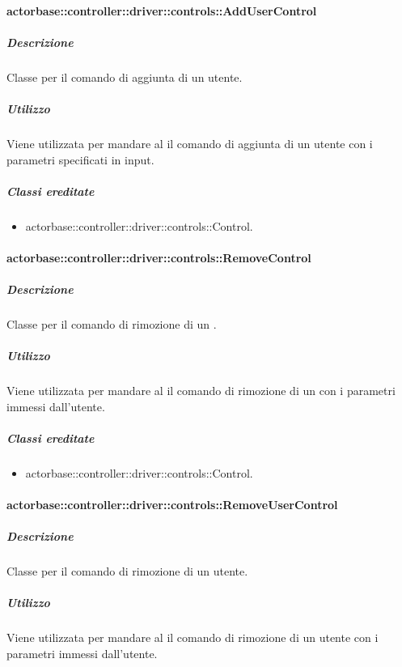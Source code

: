 \documentclass{scalatekids-article}
\begin{document}
\paragraph{actorbase::controller::driver::controls::AddUserControl}

\subparagraph{Descrizione}

Classe per il comando di aggiunta di un utente.

\subparagraph{Utilizzo}

Viene utilizzata per mandare al  il comando di aggiunta di un
utente con i parametri specificati in input.

\subparagraph{Classi ereditate}

\begin{itemize}
\item actorbase::controller::driver::controls::Control.
\end{itemize}

\paragraph{actorbase::controller::driver::controls::RemoveControl}

\subparagraph{Descrizione}

Classe per il comando di rimozione di un .

\subparagraph{Utilizzo}

Viene utilizzata per mandare al  il comando di rimozione di un
 con i parametri immessi dall'utente.

\subparagraph{Classi ereditate}

\begin{itemize}
\item actorbase::controller::driver::controls::Control.
\end{itemize}

\paragraph{actorbase::controller::driver::controls::RemoveUserControl}

\subparagraph{Descrizione}

Classe per il comando di rimozione di un utente.

\subparagraph{Utilizzo}

Viene utilizzata per mandare al  il comando di rimozione di un
utente con i parametri immessi dall'utente.
\end{document}
